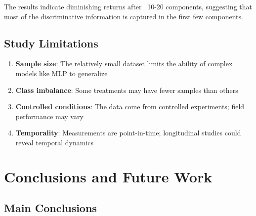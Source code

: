 \documentclass[12pt,a4paper]{article}
\begin{document}
The results indicate diminishing returns after ~10-20 components, suggesting that most of the discriminative information is captured in the first few components.

\subsection{Study Limitations}

\begin{enumerate}
    \item \textbf{Sample size}: The relatively small dataset limits the ability of complex models like MLP to generalize
    \item \textbf{Class imbalance}: Some treatments may have fewer samples than others
    \item \textbf{Controlled conditions}: The data come from controlled experiments; field performance may vary
    \item \textbf{Temporality}: Measurements are point-in-time; longitudinal studies could reveal temporal dynamics
\end{enumerate}

\newpage
\section{Conclusions and Future Work}
\label{sec:conclusions}

\subsection{Main Conclusions}
\end{document}

